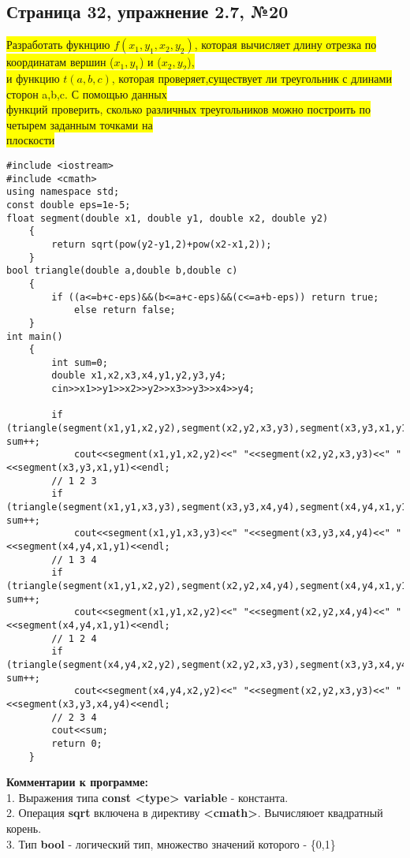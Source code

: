 \documentclass[11pt]{article}
\begin{document}
\begin{flushleft}
\begin{center}
\section{Страница 32, упражнение 2.7, №20}
\colorbox{yellow}{Разработать фукнцию $f(x_1,y_1,x_2,y_2)$, которая вычисляет длину отрезка по координатам вершин ($x_1,y_1$) и ($x_2,y_2$),}\\
\colorbox{yellow}{ и функцию $t(a,b,c)$, которая проверяет,существует ли треугольник с длинами сторон a,b,c. С помощью данных}\\
\colorbox{yellow}{ функций проверить, сколько различных треугольников можно построить по четырем заданным точками на}\\
\colorbox{yellow}{ плоскости}
\end{center}
\begin{lstlisting}
#include <iostream>
#include <cmath>
using namespace std;
const double eps=1e-5;
float segment(double x1, double y1, double x2, double y2)
	{
		return sqrt(pow(y2-y1,2)+pow(x2-x1,2));
	}
bool triangle(double a,double b,double c)
	{
		if ((a<=b+c-eps)&&(b<=a+c-eps)&&(c<=a+b-eps)) return true;
			else return false;
	}
int main()
	{
		int sum=0;
		double x1,x2,x3,x4,y1,y2,y3,y4;
		cin>>x1>>y1>>x2>>y2>>x3>>y3>>x4>>y4;

		if (triangle(segment(x1,y1,x2,y2),segment(x2,y2,x3,y3),segment(x3,y3,x1,y1))) sum++;
			cout<<segment(x1,y1,x2,y2)<<" "<<segment(x2,y2,x3,y3)<<" "<<segment(x3,y3,x1,y1)<<endl;
		// 1 2 3
		if (triangle(segment(x1,y1,x3,y3),segment(x3,y3,x4,y4),segment(x4,y4,x1,y1))) sum++;
			cout<<segment(x1,y1,x3,y3)<<" "<<segment(x3,y3,x4,y4)<<" "<<segment(x4,y4,x1,y1)<<endl;
		// 1 3 4
		if (triangle(segment(x1,y1,x2,y2),segment(x2,y2,x4,y4),segment(x4,y4,x1,y1))) sum++;
			cout<<segment(x1,y1,x2,y2)<<" "<<segment(x2,y2,x4,y4)<<" "<<segment(x4,y4,x1,y1)<<endl;
		// 1 2 4
		if (triangle(segment(x4,y4,x2,y2),segment(x2,y2,x3,y3),segment(x3,y3,x4,y4))) sum++;
			cout<<segment(x4,y4,x2,y2)<<" "<<segment(x2,y2,x3,y3)<<" "<<segment(x3,y3,x4,y4)<<endl;
		// 2 3 4
		cout<<sum;
		return 0;
	}
\end{lstlisting}

\textbf{Комментарии к программе:} \\
1. Выражения типа \textbf{const <type> variable} - константа.\\
2. Операция \textbf{sqrt} включена в директиву \textbf{<cmath>}. Вычисляюет квадратный корень.\\
3. Тип \textbf{bool} - логический тип, множество значений которого - \{0,1\}\\


\end{flushleft}
\end{document}
